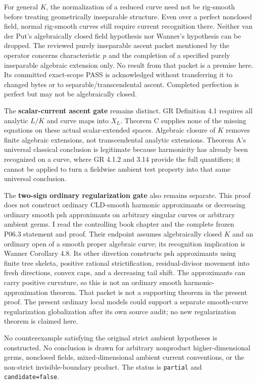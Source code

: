 \documentclass[
  11pt,
]{article}
\begin{document}
For general \(K\), the normalization of a reduced curve need not be
rig-smooth before treating geometrically inseparable structure. Even
over a perfect nonclosed field, normal rig-smooth curves still require
current recognition there. Neither van der Put's algebraically closed
field hypothesis nor Wanner's hypothesis can be dropped. The reviewed
purely inseparable ascent packet mentioned by the operator concerns
characteristic \(p\) and the completion of a specified purely
inseparable algebraic extension only. No result from that packet is a
premise here. Its committed exact-scope PASS is acknowledged without
transferring it to changed bytes or to separable/transcendental ascent.
Completed perfection is perfect but may not be algebraically closed.

The \textbf{scalar-current ascent gate} remains distinct. GR Definition
4.1 requires all analytic \(L/K\) and curve maps into \(X_L\). Theorem C
supplies none of the missing equations on these actual scalar-extended
spaces. Algebraic closure of \(K\) removes finite algebraic extensions,
not transcendental analytic extensions. Theorem A's universal classical
conclusion is legitimate because harmonicity has already been recognized
on a curve, where GR 4.1.2 and 3.14 provide the full quantifiers; it
cannot be applied to turn a fieldwise ambient test property into that
same universal conclusion.

The \textbf{two-sign ordinary regularization gate} also remains
separate. This proof does not construct ordinary CLD-smooth harmonic
approximants or decreasing ordinary smooth psh approximants on arbitrary
singular curves or arbitrary ambient germs. I read the controlling book
chapter and the complete frozen P06.3 statement and proof. Their
endpoint assumes algebraically closed \(K\) and an ordinary open of a
smooth proper algebraic curve; its recognition implication is Wanner
Corollary 4.8. Its other direction constructs psh approximants using
finite tree skeleta, positive rational strictification, residual-divisor
movement into fresh directions, convex caps, and a decreasing tail
shift. The approximants can carry positive curvature, so this is not an
ordinary smooth harmonic-approximation theorem. That packet is not a
supporting theorem in the present proof. The present ordinary local
models could support a separate smooth-curve regularization
globalization after its own source audit; no new regularization theorem
is claimed here.

No counterexample satisfying the original strict ambient hypotheses is
constructed. No conclusion is drawn for arbitrary nonproduct
higher-dimensional germs, nonclosed fields, mixed-dimensional ambient
current conventions, or the non-strict invisible-boundary product. The
status is \texttt{partial} and \texttt{candidate=false}.
\end{document}
